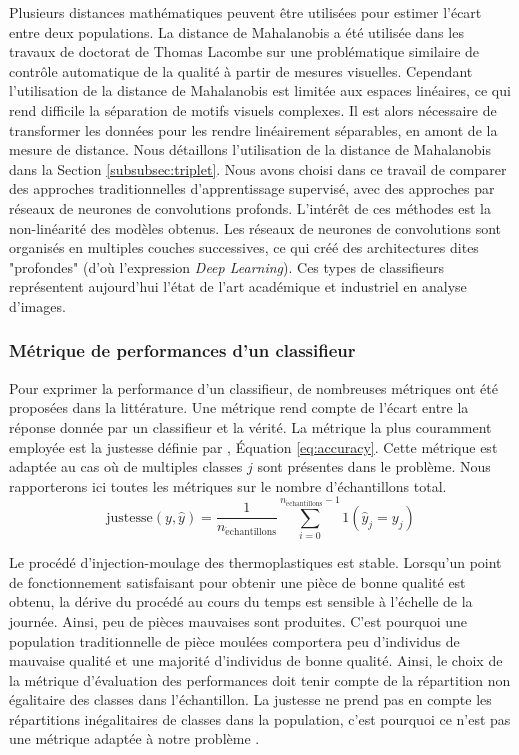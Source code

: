 Plusieurs distances mathématiques peuvent être utilisées pour estimer l'écart entre deux populations.
La distance de Mahalanobis \cite{mahalanobis_generalised_1936} a été utilisée dans les travaux de doctorat de Thomas Lacombe \cite{lacombe_exploitation_2018a} sur une problématique similaire de contrôle automatique de la qualité à partir de mesures visuelles.
Cependant l'utilisation de la distance de Mahalanobis est limitée aux espaces linéaires, ce qui rend difficile la séparation de motifs visuels complexes.
Il est alors nécessaire de transformer les données pour les rendre linéairement séparables, en amont de la mesure de distance.
Nous détaillons l'utilisation de la distance de Mahalanobis dans la Section \ref{subsubsec:triplet}.
Nous avons choisi dans ce travail de comparer des approches traditionnelles d'apprentissage supervisé, avec des approches par réseaux de neurones de convolutions profonds.
L'intérêt de ces méthodes est la non-linéarité des modèles obtenus.
Les réseaux de neurones de convolutions sont organisés en multiples couches successives, ce qui créé des architectures dites "profondes" (d'où l'expression \textit{Deep Learning}).
Ces types de classifieurs représentent aujourd'hui l'état de l'art académique et industriel en analyse d'images.

\subsubsection{Métrique de performances d'un classifieur}
Pour exprimer la performance d'un classifieur, de nombreuses métriques ont été proposées dans la littérature.
Une métrique rend compte de l'écart entre la réponse donnée par un classifieur et la vérité.
La métrique la plus couramment employée est la justesse définie par \cite{metz_basic_1978}, Équation \ref{eq:accuracy}.
Cette métrique est adaptée au cas où de multiples classes $j$ sont présentes dans le problème.
Nous rapporterons ici toutes les métriques sur le nombre d'échantillons total.
\begin{equation} \label{eq:accuracy}
\text{justesse}(y, \hat{y})=\frac{1}{n_{\mathrm{\acute{e}chantillons}}} \sum_{i=0}^{n_{\mathrm{\acute{e}chantillons}}-1} 1\left(\hat{y}_{j}=y_{j}\right)
\end{equation}

Le procédé d'injection-moulage des thermoplastiques est stable.
Lorsqu'un point de fonctionnement satisfaisant pour obtenir une pièce de bonne qualité est obtenu, la dérive du procédé au cours du temps est sensible à l'échelle de la journée. Ainsi, peu de pièces mauvaises sont produites.
C'est pourquoi une population traditionnelle de pièce moulées comportera peu d'individus de mauvaise qualité et une majorité d'individus de bonne qualité.
Ainsi, le choix de la métrique d'évaluation des performances doit tenir compte de la répartition non égalitaire des classes dans l'échantillon.
La justesse ne prend pas en compte les répartitions inégalitaires de classes dans la population, c'est pourquoi ce n'est pas une métrique adaptée à notre problème \cite{japkowicz_class_2002}.

